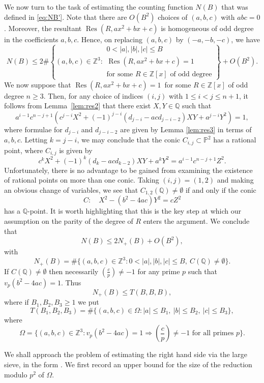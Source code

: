 \documentclass[JEP,XML,SOM,Unicode]{cedram}
\DeclareMathOperator{\Res}{Res}
\newcommand{\PP}{\mathbb{P}}
\newcommand{\QQ}{\mathbb{Q}}\let\Q\QQ
\newcommand{\ZZ}{\mathbb{Z}}\let\Z\ZZ
\begin{document}
We
now turn to the task of estimating the counting function $N(B)$ that was defined in
\eqref{eq:NB'}.
Note that there are $O(B^2)$ choices of $(a,b,c)$ with $abc= 0$.
Moreover, the resultant $\Res(R,ax^2+bx+c)$ is homogeneous of odd degree
in the coefficients $a,b,c$. Hence, on replacing $(a,b,c)$ by $(-a,-b,-c)$, we have
\[
N(B)\leq
2\#\left\{(a,b,c)\in \ZZ^3:
\begin{array}{l}
0<|a|,|b|,|c|\leq B\\
\Res(R,ax^2+bx+c)=1\\
\text{for some $R\in \ZZ[x]$ of odd degree}
\end{array}
\right\}
+O(B^2).
\]
We now suppose that
$\Res(R,ax^2+bx+c)=1$\
for some $R\in \ZZ[x]$ of odd degree $n\geq 3$.
Then, for any choice of indices $(i,j)$ with $1\leq i<j\leq n+1$, it follows from Lemma~\ref{lem:res2} that
there exist $X,Y\in \QQ$ such that
\[
a^{i-1}c^{n-j+1}\left(c^{j-i}X^2+(-1)^{j-i}(d_{j-i}-acd_{j-i-2})XY+a^{j-i}Y^2\right)= 1,
\]
where formulae for $d_{j-i}$ and $d_{j-i-2}$ are given by Lemma \ref{lem:res3} in
terms of $a,b,c$.
Letting $k=j-i$, we may conclude that the conic $C_{i,j}\subset \PP^2$
has a rational point, where $C_{i,j}$ is given by
\[
c^{k}X^2+(-1)^{k}(d_{k}-acd_{k-2})XY+a^{k}Y^2= a^{i-1}c^{n-j+1}Z^2.
\]
Unfortunately, there is no advantage to be gained from
examining the existence of rational points on more than one conic.
Taking $(i,j)=(1,2)$ and making an obvious change of variables, we see that $C_{1,2}(\QQ)\neq \emptyset$ if and only if
the conic
\[
C: \quad X^2-(b^2-4ac)Y^2=cZ^2
\]
has a $\QQ$-point. It is worth highlighting that this is the key step at which our assumption on the parity of the degree of $R$ enters the argument. We conclude that
\begin{equation}\label{eq:comic}
N(B)\leq 2N_+(B)+O(B^2),
\end{equation}
with
\[
N_+(B)=
\#\bigl\{(a,b,c)\in \ZZ^3:
0<|a|,|b|,|c|\leq B,~
C(\QQ)\neq \emptyset
\bigr\}.
\]
If $C(\QQ)\neq \emptyset$ then necessarily
$(\frac{c}{p})\neq -1$
for any prime $p$ such that $v_p(b^2-4ac)=1$.
Thus
\begin{equation}\label{eq:book}
N_+(B)\leq
T(B,B,B),
\end{equation}
where
if $B_1,B_2,B_3\geq 1$ we put
\[
T(B_1,B_2,B_3)=
\#\bigl\{(a,b,c)\in \Omega:
|a|\leq B_1,~|b|\leq B_2,~|c|\leq B_3
\bigr\},
\]
where
\[
\Omega=
\biggl\{(a,b,c)\in \ZZ^3:
v_p(b^2-4ac)=1\Rightarrow \left(\frac{c}{p}\right)\neq -1
\text{ for all primes $p$}\biggr\}.
\]

We shall approach the problem of estimating the right hand side via the
large sieve,
in the form
\cite[Lem.\,6.3]{large}.
We first record an upper bound for the size of the reduction modulo $p^2$ of $\Omega$.
\end{document}
